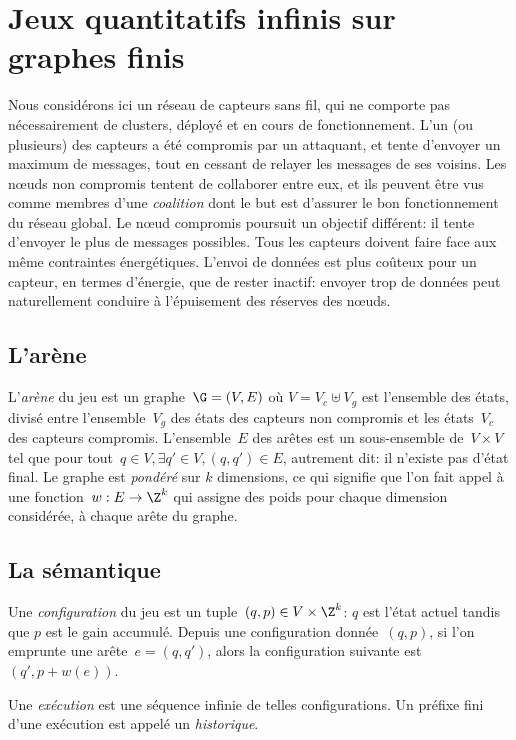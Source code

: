\section{Jeux quantitatifs infinis sur graphes finis}
\label{tj:sec:model}

Nous considérons ici un réseau de capteurs sans fil, qui ne comporte pas nécessairement de clusters, déployé et en cours de fonctionnement.
L'un (ou plusieurs) des capteurs a été compromis par un attaquant, et tente d'envoyer un maximum de messages, tout en cessant de relayer les messages de ses voisins.
Les nœuds non compromis tentent de collaborer entre eux, et ils peuvent être vus comme membres d'une \emph{coalition} dont le but est d'assurer le bon fonctionnement du réseau global.
Le nœud compromis poursuit un objectif différent: il tente d'envoyer le plus de messages possibles.
Tous les capteurs doivent faire face aux même contraintes énergétiques.
L'envoi de données est plus coûteux pour un capteur, en termes d'énergie, que de rester inactif: envoyer trop de données peut naturellement conduire à l'épuisement des réserves des nœuds.

\subsection{L'arène}
L'\emph{arène} du jeu est un graphe~$\G = (V,E)$ où $V = V_c \uplus V_g$ est l'ensemble des états, divisé entre l'ensemble~$V_g$ des états des capteurs non compromis et les états~$V_c$ des capteurs compromis.
L'ensemble~$E$ des arêtes est un sous-ensemble de~$V \times V$ tel que pour tout~$q \in V, \exists q' \in V, (q,q')\in E$, autrement dit: il n'existe pas d'état final.
Le graphe est \emph{pondéré} sur $k$ dimensions, ce qui signifie que l'on fait appel à une fonction~$w: E \rightarrow \Z^k$ qui assigne des poids pour chaque dimension considérée, à chaque arête du graphe.

\subsection{La sémantique}
Une \emph{configuration} du jeu est un tuple~$(q,p) \in V \times \Z^k$: $q$ est l'état actuel tandis que $p$ est le gain accumulé.
Depuis une configuration donnée~$(q,p)$, si l'on emprunte une arête~$e=(q,q')$, alors la configuration suivante est $(q',p+w(e))$.

Une \emph{exécution} est une séquence infinie de telles configurations.
Un préfixe fini d'une exécution est appelé un \emph{historique}.

